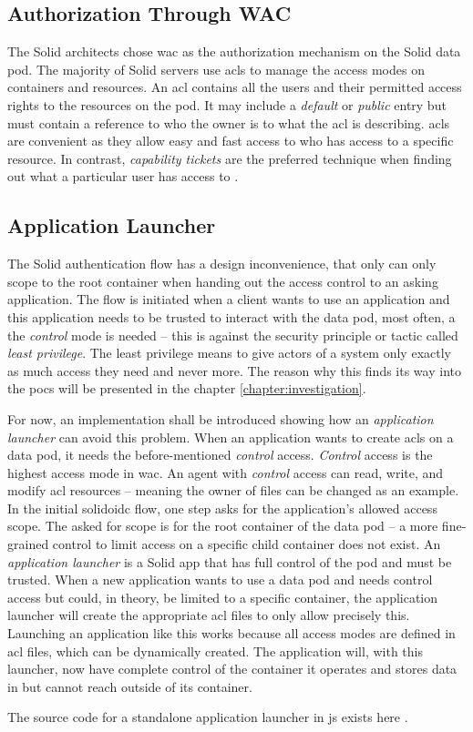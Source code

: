 \subsection{Authorization Through WAC}

The Solid architects chose \gls{wac} \cite{wac} as the authorization mechanism on the Solid data pod. The majority of Solid servers use \glspl{acl} to manage the access modes on containers and resources. An \gls{acl} contains all the users and their permitted access rights to the resources on the pod. It may include a \textit{default} or \textit{public} entry but must contain a reference to who the owner is to what the \gls{acl} is describing. \glspl{acl} are convenient as they allow easy and fast access to who has access to a specific resource. In contrast, \textit{capability tickets} are the preferred technique when finding out what a particular user has access to \cite{stallings}.

\subsection{Application Launcher}

The Solid authentication flow has a design inconvenience, that only can only scope to the root container when handing out the access control to an asking application. The flow is initiated when a client wants to use an application and this application needs to be trusted to interact with the data pod, most often, a the \textit{control} mode is needed -- this is against the security principle or tactic called \textit{least privilege}. The least privilege means to give actors of a system only exactly as much access they need and never more. The reason why this finds its way into the \glspl{poc} will be presented in the chapter \ref{chapter:investigation}.

For now, an implementation shall be introduced showing how an \textit{application launcher} can avoid this problem. When an application wants to create \glspl{acl} on a data pod, it needs the before-mentioned \textit{control} access. \textit{Control} access is the highest access mode in \gls{wac}. An agent with \textit{control} access can read, write, and modify \gls{acl} resources -- meaning the owner of files can be changed as an example.
In the initial \gls{solidoidc} flow, one step asks for the application's allowed access scope. The asked for scope is for the root container of the data pod -- a more fine-grained control to limit access on a specific child container does not exist. An \textit{application launcher} is a Solid app that has full control of the pod and must be trusted. When a new application wants to use a data pod and needs control access but could, in theory, be limited to a specific container, the application launcher will create the appropriate \gls{acl} files to only allow precisely this.
Launching an application like this works because all access modes are defined in \gls{acl} files, which can be dynamically created. The application will, with this launcher, now have complete control of the container it operates and stores data in but cannot reach outside of its container.

The source code for a standalone application launcher in \gls{js} exists here \cite{app-launcher}.
